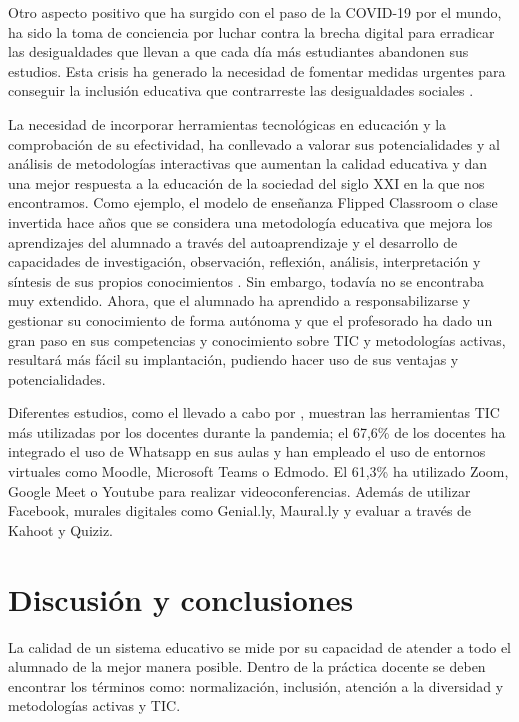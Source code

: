 \documentclass{textolivre}
\begin{document}
Otro aspecto positivo que ha surgido con el paso de la COVID-19 por el mundo, ha sido la toma de conciencia por luchar contra la brecha digital para erradicar las desigualdades que llevan a que cada día más estudiantes abandonen sus estudios. Esta crisis ha generado la necesidad de fomentar medidas urgentes para conseguir la inclusión educativa que contrarreste las desigualdades sociales \cite{rojaslondono2020}.

La necesidad de incorporar herramientas tecnológicas en educación y la comprobación de su efectividad, ha conllevado a valorar sus potencialidades y al análisis de metodologías interactivas que aumentan la calidad educativa y dan una mejor respuesta a la educación de la sociedad del siglo XXI en la que nos encontramos. Como ejemplo, el modelo de enseñanza Flipped Classroom o clase invertida hace años que se considera una metodología educativa que mejora los aprendizajes del alumnado a través del autoaprendizaje y el desarrollo de capacidades de investigación, observación, reflexión, análisis, interpretación y síntesis de sus propios conocimientos \cite{rodriguez+hidalgo2018, carreno2019}. Sin embargo, todavía no se encontraba muy extendido. Ahora, que el alumnado ha aprendido a responsabilizarse y gestionar su conocimiento de forma autónoma y que el profesorado ha dado un gran paso en sus competencias y conocimiento sobre TIC y metodologías activas, resultará más fácil su implantación, pudiendo hacer uso de sus ventajas y potencialidades. 

Diferentes estudios, como el llevado a cabo por \textcite{ardini2020}, muestran las herramientas TIC más utilizadas por los docentes durante la pandemia; el 67,6\% de los docentes ha integrado el uso de Whatsapp en sus aulas y han empleado el uso de entornos virtuales como Moodle, Microsoft Teams o Edmodo. El 61,3\% ha utilizado Zoom, Google Meet o Youtube para realizar videoconferencias. Además de utilizar Facebook, murales digitales como Genial.ly, Maural.ly y evaluar a través de Kahoot y Quiziz.

\section{Discusión y conclusiones}
La calidad de un sistema educativo se mide por su capacidad de atender a todo el alumnado de la mejor manera posible. Dentro de la práctica docente se deben encontrar los términos como: normalización, inclusión, atención a la diversidad y metodologías activas y TIC.
\end{document}
